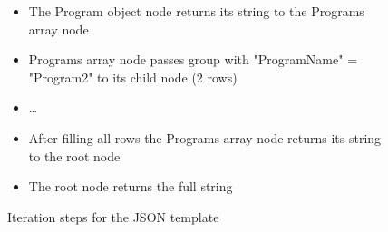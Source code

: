\begin{figure}[]
\begin{itemize}
        \item The Program object node returns its string to the Programs array node
        \item Programs array node passes group with "ProgramName" = "Program2" to its child node (2 rows)
        \item \dots
        \item After filling all rows the Programs array node returns its string to the root node
        \item The root node returns the full string
    \end{itemize}
    \caption{Iteration steps for the JSON template}
    \label{itemize:json_iteration}
\end{figure}
